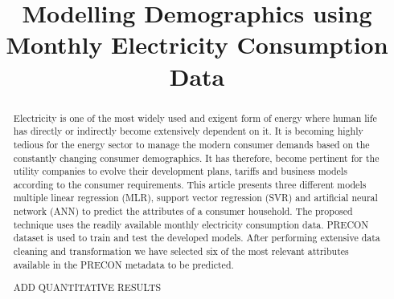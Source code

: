 \documentclass[conference]{IEEEtran}
\begin{document}
\title{Modelling Demographics using Monthly Electricity Consumption Data\\

}

\author{
\and
{}
\and
{}
\and
{}
}

\maketitle

\begin{abstract}
Electricity is one of the most widely used and exigent form of energy where human life has directly or indirectly become extensively dependent on it. It is becoming highly tedious for the energy sector to manage the modern consumer demands based on the constantly changing consumer demographics. It has therefore, become pertinent for the utility companies to evolve their development plans, tariffs and business models according to the consumer requirements. This article presents three different models multiple linear regression (MLR), support vector regression (SVR) and artificial neural network (ANN) to predict the attributes of a consumer household. The proposed technique uses the readily available monthly electricity consumption data. PRECON dataset is used to train and test the developed models. After performing extensive data cleaning and transformation we have selected six of the most relevant attributes available in the PRECON metadata to be predicted. 

ADD QUANTITATIVE RESULTS

\end{abstract}
\end{document}
